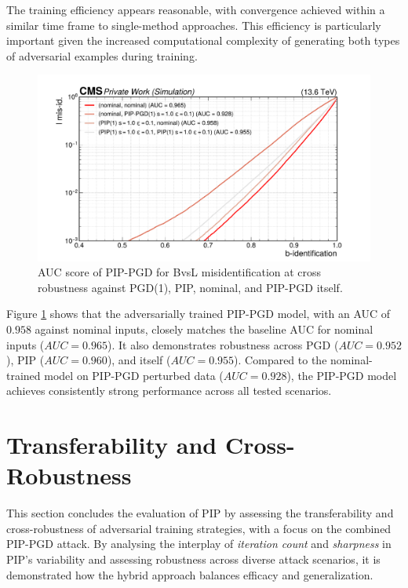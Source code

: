 The training efficiency appears reasonable, with convergence achieved within a similar time frame to single-method approaches. This efficiency is particularly important given the increased computational complexity of generating both types of adversarial examples during training.

\begin{figure}[h]
\centering
    \includegraphics[width=15cm]{media/output/roc_bvsl_combined_crossing.pdf}
    \caption{AUC score of PIP-PGD for BvsL misidentification at cross robustness against PGD(1), PIP, nominal, and PIP-PGD itself.}
    \label{fig:joint_training_crossing}
\end{figure}

Figure \ref{fig:joint_training_crossing} shows that the adversarially trained PIP-PGD model, with an AUC of $0.958$ against nominal inputs, closely matches the baseline AUC for nominal inputs ($AUC = 0.965$). It also demonstrates robustness across PGD ($AUC = 0.952$), PIP ($AUC = 0.960$), and itself ($AUC = 0.955$). Compared to the nominal-trained model on PIP-PGD perturbed data ($AUC = 0.928$), the PIP-PGD model achieves consistently strong performance across all tested scenarios.




\FloatBarrier
\section{Transferability and Cross-Robustness}

This section concludes the evaluation of PIP by assessing the transferability and cross-robustness of adversarial training strategies, with a focus on the combined PIP-PGD attack. By analysing the interplay of \textit{iteration count} and \textit{sharpness} in PIP’s variability and assessing robustness across diverse attack scenarios, it is demonstrated how the hybrid approach balances efficacy and generalization.

